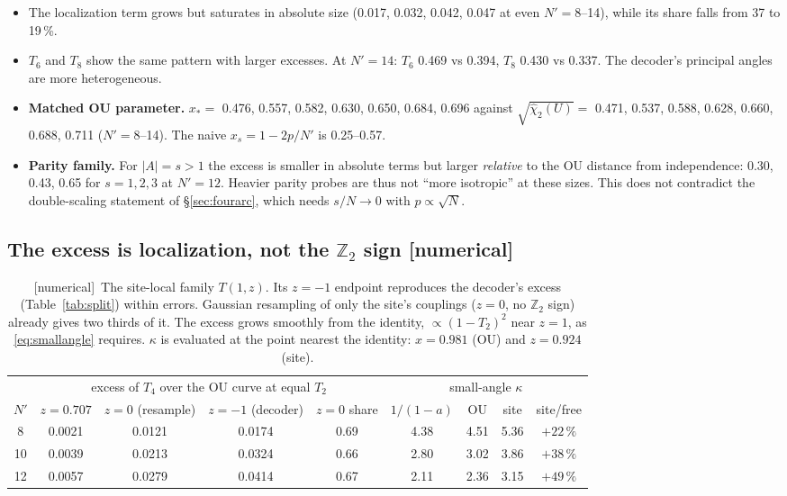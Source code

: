 \documentclass[11pt]{article}
\newcommand{\Np}{N'}
\newcommand{\tagbox}[2]{\textsf{\small\color{#1}[#2]}}
\newcommand{\NUM}{\tagbox{cnum}{numerical}}
\theoremstyle{remark}
\begin{document}
\begin{itemize}\itemsep1pt
\item The localization term grows but saturates in absolute size (0.017, 0.032, 0.042, 0.047 at even $\Np=8$--14), while
  its share falls from 37 to 19\,\%.
\item $T_6$ and $T_8$ show the same pattern with larger excesses. At $\Np=14$: $T_6$ 0.469 vs 0.394, $T_8$ 0.430 vs 0.337.
  The decoder's principal angles are more heterogeneous.
\item \textbf{Matched OU parameter.} $x_*=$ 0.476, 0.557, 0.582, 0.630, 0.650, 0.684, 0.696 against
  $\sqrt{\hat\chi_2(U)}=$ 0.471, 0.537, 0.588, 0.628, 0.660, 0.688, 0.711 ($\Np=8$--14). The naive $x_s=1-2p/\Np$ is
  0.25--0.57.
\item \textbf{Parity family.} For $|A|=s>1$ the excess is smaller in absolute terms but larger \emph{relative} to the OU
  distance from independence: 0.30, 0.43, 0.65 for $s=1,2,3$ at $\Np=12$. Heavier parity probes are thus not ``more
  isotropic'' at these sizes. This does not contradict the double-scaling statement of \S\ref{sec:fourarc}, which needs
  $s/N\to0$ with $p\propto\sqrt N$.
\end{itemize}

\subsection{The excess is localization, not the $\mathbb Z_2$ sign \NUM}
\begin{table}[!htbp]
\centering\footnotesize
\begin{tabular}{@{}ccccc|cccc@{}}
\toprule
& \multicolumn{4}{c|}{excess of $T_4$ over the OU curve at equal $T_2$} & \multicolumn{4}{c}{small-angle $\kappa$}\\
$\Np$ & $z=0.707$ & $z=0$ (resample) & $z=-1$ (decoder) & $z=0$ share & $1/(1-a)$ & OU & site & site/free\\
\midrule
8 & 0.0021 & 0.0121 & 0.0174 & 0.69 & 4.38 & 4.51 & 5.36 & $+22\,\%$\\
10 & 0.0039 & 0.0213 & 0.0324 & 0.66 & 2.80 & 3.02 & 3.86 & $+38\,\%$\\
12 & 0.0057 & 0.0279 & 0.0414 & 0.67 & 2.11 & 2.36 & 3.15 & $+49\,\%$\\
\bottomrule
\end{tabular}
\caption{\NUM\ The site-local family $T(1,z)$. Its $z=-1$ endpoint reproduces the decoder's excess (Table~\ref{tab:split})
within errors. Gaussian resampling of only the site's couplings ($z=0$, no $\mathbb Z_2$ sign) already gives two thirds
of it. The excess grows smoothly from the identity, $\propto(1-T_2)^2$ near $z=1$, as \eqref{eq:smallangle} requires.
$\kappa$ is evaluated at the point nearest the identity: $x=0.981$ (OU) and $z=0.924$ (site).}
\label{tab:site}
\end{table}
\end{document}
